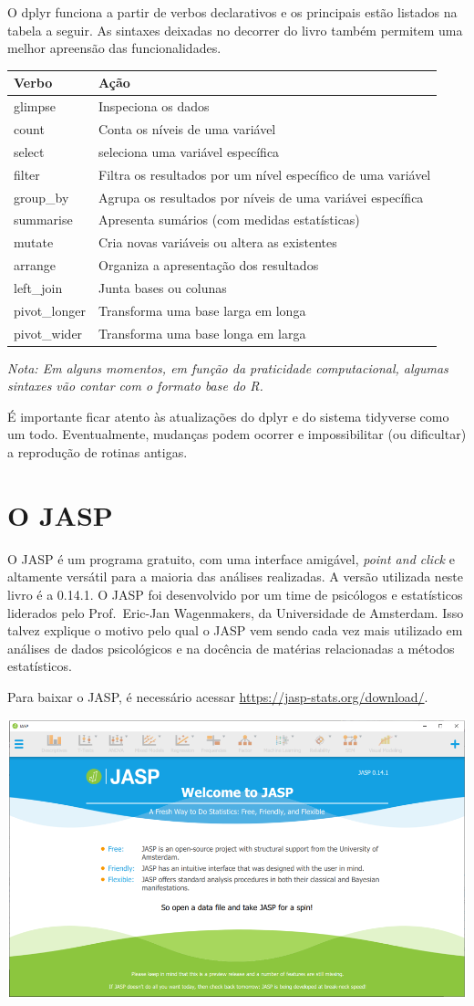 \documentclass[
]{book}
\begin{document}
O dplyr funciona a partir de verbos declarativos e os principais estão listados na tabela a seguir. As sintaxes deixadas no decorrer do livro também permitem uma melhor apreensão das funcionalidades.

\begin{longtable}[]{@{}ll@{}}
\toprule
Verbo & Ação\tabularnewline
\midrule
\endhead
glimpse & Inspeciona os dados\tabularnewline
count & Conta os níveis de uma variável\tabularnewline
select & seleciona uma variável específica\tabularnewline
filter & Filtra os resultados por um nível específico de uma variável\tabularnewline
group\_by & Agrupa os resultados por níveis de uma variávei específica\tabularnewline
summarise & Apresenta sumários (com medidas estatísticas)\tabularnewline
mutate & Cria novas variáveis ou altera as existentes\tabularnewline
arrange & Organiza a apresentação dos resultados\tabularnewline
left\_join & Junta bases ou colunas\tabularnewline
pivot\_longer & Transforma uma base larga em longa\tabularnewline
pivot\_wider & Transforma uma base longa em larga\tabularnewline
\bottomrule
\end{longtable}

\emph{Nota: Em alguns momentos, em função da praticidade computacional, algumas sintaxes vão contar com o formato base do R.}

É importante ficar atento às atualizações do dplyr e do sistema tidyverse como um todo. Eventualmente, mudanças podem ocorrer e impossibilitar (ou dificultar) a reprodução de rotinas antigas.

\hypertarget{o-jasp}{%
\section{O JASP}\label{o-jasp}}

O JASP é um programa gratuito, com uma interface amigável, \emph{point and click} e altamente versátil para a maioria das análises realizadas. A versão utilizada neste livro é a 0.14.1. O JASP foi desenvolvido por um time de psicólogos e estatísticos liderados pelo Prof.~Eric-Jan Wagenmakers, da Universidade de Amsterdam. Isso talvez explique o motivo pelo qual o JASP vem sendo cada vez mais utilizado em análises de dados psicológicos e na docência de matérias relacionadas a métodos estatísticos.

Para baixar o JASP, é necessário acessar \url{https://jasp-stats.org/download/}.

\includegraphics{./img/cap_jasp_interface.png}
\end{document}
